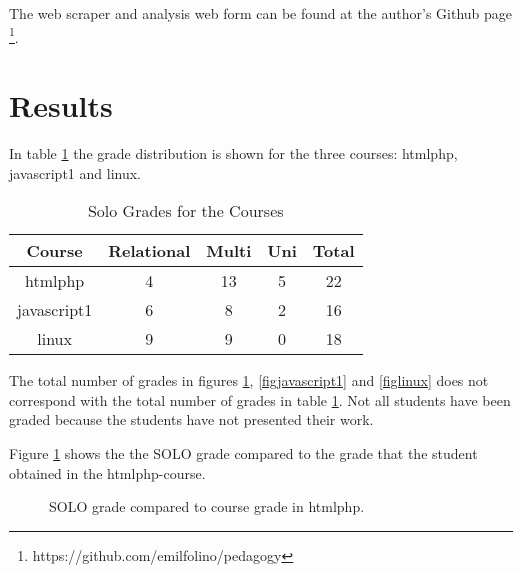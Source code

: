 \documentclass[twoside,twocolumn,a4paper,11pt,english]{article}
\begin{document}
The web scraper and analysis web form can be found at the author's Github page \footnote{https://github.com/emilfolino/pedagogy}.




\section{Results}

In table \ref{table:solo} the grade distribution is shown for the three courses: htmlphp, javascript1 and linux.

\begin{table}[H]
\caption{Solo Grades for the Courses}
\centering
\begin{tabular}{c | c c c | c}
Course & Relational & Multi & Uni & Total  \\ [0.5ex] %
\hline
htmlphp & 4 & 13 & 5 & 22 \\
javascript1 & 6 & 8 & 2 & 16\\
linux & 9 & 9 & 0 & 18 \\ [1ex]
\end{tabular}
\label{table:solo}
\end{table}

The total number of grades in figures \ref{fightmlphp}, \ref{figjavascript1} and \ref{figlinux} does not correspond with the total number of grades in table \ref{table:solo}. Not all students have been graded because the students have not presented their work.

Figure \ref{fightmlphp} shows the the SOLO grade compared to the grade that the student obtained in the htmlphp-course.

\begin{figure}[H]
\caption{SOLO grade compared to course grade in htmlphp.}
\label{fightmlphp}
\end{figure}
\end{document}
